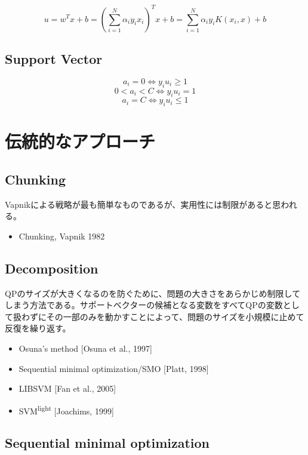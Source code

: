 \documentclass[10pt,a4paper]{jsarticle}
\begin{document}
\begin{equation}
u=w^Tx +b = (\sum_{i=1}^N \alpha_{i}y_{i}x_{i})^Tx +b = \sum_{i=1}^N \alpha_{i}y_{i}K(x_{i},x) +b
\end{equation}

\subsection{Support Vector}

\[ a_{i} = 0 \Leftrightarrow y_{i}u_{i} \ge 1  \]
\[ 0 < a_{i} < C \Leftrightarrow y_{i}u_{i} = 1  \]
\[ a_{i} = C \Leftrightarrow y_{i}u_{i} \le 1  \]

\section{伝統的なアプローチ}
\subsection{Chunking}

Vapnikによる戦略が最も簡単なものであるが、実用性には制限があると思われる。

\begin{itemize}
\item Chunking, Vapnik 1982
\end{itemize}

\subsection{Decomposition}

QPのサイズが大きくなるのを防ぐために、問題の大きさをあらかじめ制限してしまう方法である。サポートベクターの候補となる変数をすべてQPの変数として扱わずにその一部のみを動かすことによって、問題のサイズを小規模に止めて反復を繰り返す。

\begin{itemize}
\item Osuna's method [Osuna et al., 1997]
\item Sequential minimal optimization/SMO [Platt, 1998]
\item LIBSVM [Fan et al., 2005]
\item SVM\textsuperscript{light} [Joachims, 1999]
\end{itemize}

\subsection{Sequential minimal optimization}
\end{document}
